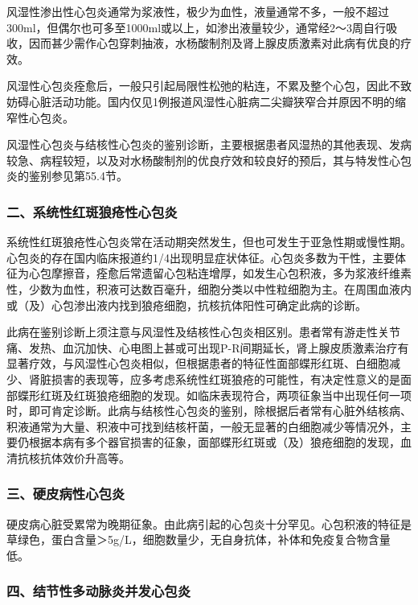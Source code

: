 风湿性渗出性心包炎通常为浆液性，极少为血性，液量通常不多，一般不超过300ml，但偶尔也可多至1000ml或以上，如渗出液量较少，通常经2～3周自行吸收，因而甚少需作心包穿刺抽液，水杨酸制剂及肾上腺皮质激素对此病有优良的疗效。

风湿性心包炎痊愈后，一般只引起局限性松弛的粘连，不累及整个心包，因此不致妨碍心脏活动功能。国内仅见1例报道风湿性心脏病二尖瓣狭窄合并原因不明的缩窄性心包炎。

风湿性心包炎与结核性心包炎的鉴别诊断，主要根据患者风湿热的其他表现、发病较急、病程较短，以及对水杨酸制剂的优良疗效和较良好的预后，其与特发性心包炎的鉴别参见第55.4节。

\subsubsection{二、系统性红斑狼疮性心包炎}

系统性红斑狼疮性心包炎常在活动期突然发生，但也可发生于亚急性期或慢性期。心包炎的存在国内临床报道约1/4出现明显症状体征。心包炎多数为干性，主要体征为心包摩擦音，痊愈后常遗留心包粘连增厚，如发生心包积液，多为浆液纤维素性，少数为血性，积液可达数百毫升，细胞分类以中性粒细胞为主。在周围血液内或（及）心包渗出液内找到狼疮细胞，抗核抗体阳性可确定此病的诊断。

此病在鉴别诊断上须注意与风湿性及结核性心包炎相区别。患者常有游走性关节痛、发热、血沉加快、心电图上甚或可出现P-R间期延长，肾上腺皮质激素治疗有显著疗效，与风湿性心包炎相似，但根据患者的特征性面部蝶形红斑、白细胞减少、肾脏损害的表现等，应多考虑系统性红斑狼疮的可能性，有决定性意义的是面部蝶形红斑及红斑狼疮细胞的发现。如临床表现符合，两项征象当中出现任何一项时，即可肯定诊断。此病与结核性心包炎的鉴别，除根据后者常有心脏外结核病、积液通常为大量、积液中可找到结核杆菌，一般无显著的白细胞减少等情况外，主要仍根据本病有多个器官损害的征象，面部蝶形红斑或（及）狼疮细胞的发现，血清抗核抗体效价升高等。

\subsubsection{三、硬皮病性心包炎}

硬皮病心脏受累常为晚期征象。由此病引起的心包炎十分罕见。心包积液的特征是草绿色，蛋白含量＞5g/L，细胞数量少，无自身抗体，补体和免疫复合物含量低。

\subsubsection{四、结节性多动脉炎并发心包炎}

